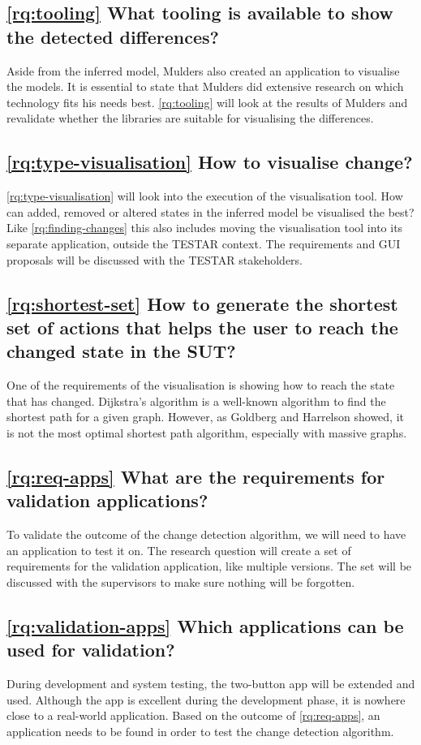 \subsection{\ref{rq:tooling} What tooling is available to show the detected differences?}
Aside from the inferred model, Mulders also created an application to visualise the models. It is essential to state that Mulders did extensive research on which technology fits his needs best. \ref{rq:tooling} will look at the results of Mulders and revalidate whether the libraries are suitable for visualising the differences. 

\subsection{\ref{rq:type-visualisation} How to visualise change?}
\ref{rq:type-visualisation} will look into the execution of the visualisation tool. How can added, removed or altered states in the inferred model be visualised the best? Like \ref{rq:finding-changes} this also includes moving the visualisation tool into its separate application, outside the TESTAR context. The requirements and GUI proposals will be discussed with the TESTAR stakeholders. 

\subsection{\ref{rq:shortest-set} How to generate the shortest set of actions that helps the user to reach the changed state in the SUT?}
One of the requirements of the visualisation is showing how to reach the state that has changed. Dijkstra's algorithm \cite{dijkstra1959note} is a well-known algorithm to find the shortest path for a given graph. However, as Goldberg and Harrelson \cite{goldberg2005computing} showed, it is not the most optimal shortest path algorithm, especially with massive graphs. 

\subsection{\ref{rq:req-apps} What are the requirements for validation applications?}
To validate the outcome of the change detection algorithm, we will need to have an application to test it on. The research question will create a set of requirements for the validation application, like multiple versions. The set will be discussed with the supervisors to make sure nothing will be forgotten.

\subsection{\ref{rq:validation-apps} Which applications can be used for validation?}
During development and system testing, the two-button app will be extended and used. Although the app is excellent during the development phase, it is nowhere close to a real-world application. Based on the outcome of \ref{rq:req-apps}, an application needs to be found in order to test the change detection algorithm.

